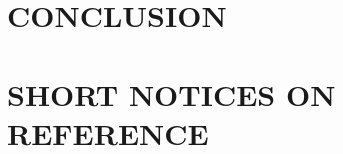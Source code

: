 \documentclass[a4paper,13pt,3p,twoside]{report}
\renewcommand{\bibname}{reference}
\renewcommand{\figurename}{Figure}
\renewcommand{\tablename}{Table}
\renewcommand{\chaptername}{CHAPTER}
\theoremstyle{definition}
\begin{document}
\chapter{CONCLUSION} %
\label{chapter:conclusion}


\newpage
\chapter*{SHORT NOTICES ON REFERENCE} %
\label{chapter:reference}


\newpage
\renewcommand\bibname{REFERENCE}
\printbibliography
{}



%
% 
% 
\end{document}
